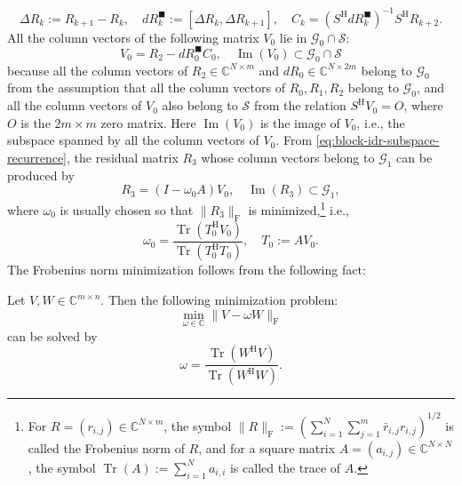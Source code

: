 \begin{equation}\label{eq:block-idr-residual-differences}\Delta R_k:=R_{k+1}-R_k,\quad dR_k^{\blacksquare}:=[\Delta R_k,\Delta R_{k+1}],\quad C_k=(S^{\mathrm H}dR_k^{\blacksquare})^{-1}S^{\mathrm H}R_{k+2}.\end{equation}
{All the column vectors of the following matrix $V_0$ lie in $\mathcal G_0\cap\mathcal S$:}
\[V_0=R_2-dR_0^{\blacksquare}C_0,\quad\operatorname{Im}(V_0)\subset\mathcal G_0\cap\mathcal S\]
{because all the column vectors of $R_2\in\mathbb C^{N\times m}$ and $dR_0\in\mathbb C^{N\times2m}$ belong to $\mathcal G_0$ from the assumption that all the column vectors of $R_0,R_1,R_2$ belong to $\mathcal G_0$, and all the column vectors of $V_0$ also belong to $\mathcal S$ from the relation $S^{\mathrm H}V_0=O$, where $O$ is the $2m\times m$ zero matrix. Here $\operatorname{Im}(V_0)$ is the image of $V_0$, i.e., the subspace spanned by all the column vectors of $V_0$.}
{From \eqref{eq:block-idr-subspace-recurrence}, the residual matrix $R_3$ whose column vectors belong to $\mathcal G_1$ can be produced by}
\begin{equation}\label{eq:block-idr-first-reduced-residual}R_3=(I-\omega_0A)V_0,\quad\operatorname{Im}(R_3)\subset\mathcal G_1,\end{equation}
{where $\omega_0$ is usually chosen so that $\|R_3\|_{\mathrm F}$ is minimized,}\footnote{{For $R=(r_{i,j})\in\mathbb C^{N\times m}$, the symbol $\|R\|_{\mathrm F}:=(\sum_{i=1}^N\sum_{j=1}^m\bar r_{i,j}r_{i,j})^{1/2}$ is called the Frobenius norm of $R$, and for a square matrix $A=(a_{i,j})\in\mathbb C^{N\times N}$, the symbol $\operatorname{Tr}(A):=\sum_{i=1}^Na_{i,i}$ is called the trace of $A$.}}
{i.e.,}
\[\omega_0=\frac{\operatorname{Tr}(T_0^{\mathrm H}V_0)}{\operatorname{Tr}(T_0^{\mathrm H}T_0)},\quad T_0:=AV_0.\]
{The Frobenius norm minimization follows from the following fact:}
\par{}
\begin{Proposition}\label{prop:frobenius-scalar-minimization}
{Let $V,W\in\mathbb C^{m\times n}$. Then the following minimization problem:}
\[\min_{\omega\in\mathbb C}\|V-\omega W\|_{\mathrm F}\]
{can be solved by}
\[\omega=\frac{\operatorname{Tr}(W^{\mathrm H}V)}{\operatorname{Tr}(W^{\mathrm H}W)}.\]
\end{Proposition}
